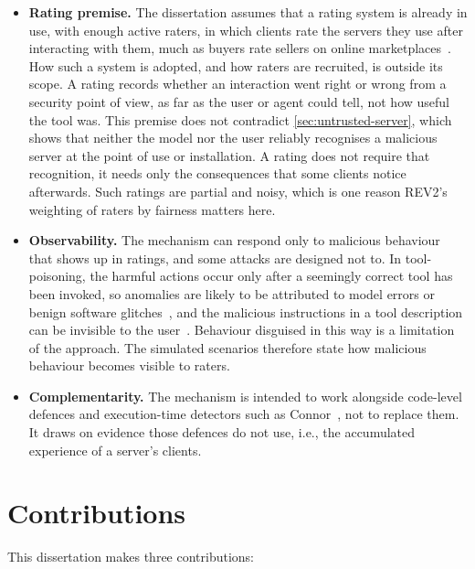 \begin{itemize}
    \item \textbf{Rating premise.} The dissertation assumes that a rating system is already in use, with enough active raters, in which clients rate the servers they use after interacting with them, much as buyers rate sellers on online marketplaces~\cite{Jsang2007}. How such a system is adopted, and how raters are recruited, is outside its scope. A rating records whether an interaction went right or wrong from a security point of view, as far as the user or agent could tell, not how useful the tool was. This premise does not contradict \cref{sec:untrusted-server}, which shows that neither the model nor the user reliably recognises a malicious server at the point of use or installation. A rating does not require that recognition, it needs only the consequences that some clients notice afterwards. Such ratings are partial and noisy, which is one reason REV2's weighting of raters by fairness matters here.

    \item \textbf{Observability.} The mechanism can respond only to malicious behaviour that shows up in ratings, and some attacks are designed not to. In \gls{tool-poisoning}, the harmful actions occur only after a seemingly correct tool has been invoked, so anomalies are likely to be attributed to model errors or benign software glitches~\cite[p.~19]{Hou2026}, and the malicious instructions in a tool description can be invisible to the user~\cite[p.~2413]{Song2026}. Behaviour disguised in this way is a limitation of the approach. The simulated scenarios therefore state how malicious behaviour becomes visible to raters.

    \item \textbf{Complementarity.} The mechanism is intended to work alongside code-level defences and execution-time detectors such as Connor~\cite{Huang2026}, not to replace them. It draws on evidence those defences do not use, i.e., the accumulated experience of a server's clients.
\end{itemize}

\section{Contributions}\label{sec:contributions}

This dissertation makes three contributions:

